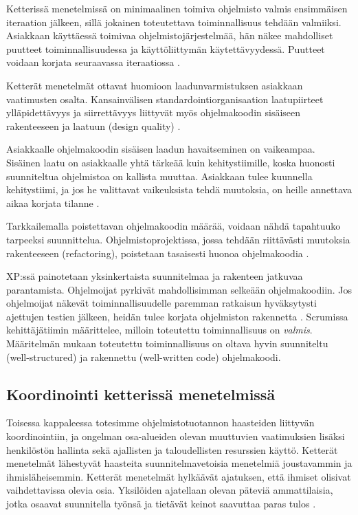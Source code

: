 \documentclass[finnish]{tktltiki2}
\theoremstyle{definition}
\theoremstyle{remark}
\begin{document}
{Ketterissä menetelmissä on minimaalinen toimiva ohjelmisto valmis ensimmäisen iteraation jälkeen, sillä jokainen toteutettava toiminnallisuus tehdään valmiiksi. Asiakkaan käyttäessä toimivaa ohjelmisto\-järjestelmää, hän näkee mahdolliset puutteet toiminnallisuudessa ja käyttö\-liittymän käy\-tettävyydessä. Puutteet voidaan korjata seuraavassa iteraatiossa \cite{BEC99}.

Ketterät menetelmät ottavat huomioon laadunvarmistuksen asiakkaan vaatimusten osalta. Kansainvälisen standardointiorganisaation laatupiirteet ylläpidettävyys ja siirrettävyys liittyvät myös ohjelmakoodin sisäiseen rakenteeseen ja laatuun (design quality) \cite{KIP96}.

Asiakkaalle ohjelmakoodin sisäisen laadun havaitseminen on vaikeampaa. Sisäinen laatu on asiakkaalle yhtä tärkeää kuin kehitystiimille, koska huonosti suunniteltua ohjelmistoa on kallista muuttaa. Asiakkaan tulee kuunnella kehitystiimi, ja jos he valittavat vaikeuksista tehdä muutoksia, on heille annettava aikaa korjata tilanne \cite{FOW01b}.

Tarkkailemalla poistettavan ohjelmakoodin määrää, voidaan nähdä tapahtuuko tarpeeksi suunnittelua. Ohjelmistoprojektissa, jossa tehdään riittävästi muutoksia rakenteeseen (refactoring), poistetaan tasaisesti huonoa ohjelmakoodia \cite{FOW01b}.

XP:ssä painotetaan yksinkertaista suunnitelmaa ja rakenteen jatkuvaa parantamista. Ohjelmoijat pyrkivät mahdollisimman selkeään ohjelmakoodiin. Jos ohjelmoijat näkevät toiminnallisuudelle paremman ratkaisun hyväksytysti ajettujen testien jälkeen, heidän tulee korjata ohjelmiston rakennetta \cite{BEC99}.
Scrumissa kehittäjätiimin määrittelee, milloin toteutettu toiminnallisuus on \textit{valmis}. Määritelmän mukaan toteutettu toiminnallisuus on oltava hyvin suunniteltu (well-structured) ja rakennettu (well-written code) ohjelmakoodi\cite{SCH09}.

\subsection{Koordinointi ketterissä menetelmissä}

Toisessa kappaleessa totesimme ohjelmistotuotannon haasteiden liittyvän koordinointiin, ja ongelman osa-alueiden olevan muuttuvien vaatimuksien lisäksi henkilöstön hallinta sekä ajallisten ja taloudellisten resurssien käyttö. Ketterät menetelmät lähestyvät haasteita suunnitelmavetoisia menetelmiä joustavammin ja ihmisläheisemmin. Ketterät menetelmät hylkäävät ajatuksen, että ihmiset olisivat vaihdettavissa olevia osia. Yksilöiden ajatellaan olevan päteviä ammattilaisia, jotka osaavat suunnitella työnsä ja tietävät keinot saavuttaa paras tulos \cite{FOW01a}.

}
\end{document}

